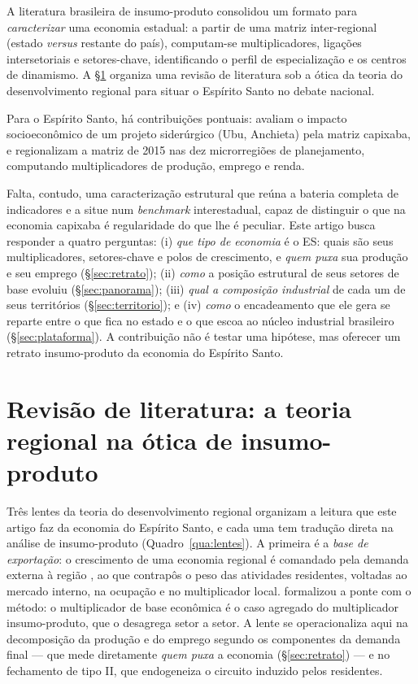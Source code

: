 \documentclass[11pt,a4paper]{article}
\begin{document}
A literatura brasileira de insumo-produto consolidou um formato para \emph{caracterizar}
uma economia estadual: a partir de uma matriz inter-regional (estado \emph{versus}
restante do país), computam-se multiplicadores, ligações intersetoriais e
setores-chave, identificando o perfil de especialização e os centros de dinamismo.
A \S\ref{sec:quadro} organiza uma revisão de literatura sob a ótica da teoria do
desenvolvimento regional para situar o Espírito Santo no debate nacional.

Para o Espírito Santo, há contribuições pontuais: \citet{sessa2017ubu} avaliam o impacto
socioeconômico de um projeto siderúrgico (Ubu, Anchieta) pela matriz capixaba, e
\citet{ribeiro2024dinamica} regionalizam a matriz de 2015 nas dez microrregiões de
planejamento, computando multiplicadores de produção, emprego e renda.

Falta, contudo, uma caracterização estrutural que reúna a bateria completa de indicadores e a
situe num \emph{benchmark} interestadual, capaz de distinguir o que na economia capixaba é
regularidade do que lhe é peculiar.
Este artigo busca responder a quatro perguntas: (i) \emph{que tipo de economia} é o ES:
quais são seus multiplicadores, setores-chave e polos de crescimento, e \emph{quem puxa}
sua produção e seu emprego (\S\ref{sec:retrato});
(ii) \emph{como} a posição estrutural de seus setores de base evoluiu
(\S\ref{sec:panorama}); (iii) \emph{qual a composição industrial} de cada um de seus
territórios (\S\ref{sec:territorio}); e (iv) \emph{como} o encadeamento que ele gera se
reparte entre o que fica no estado e o que escoa ao núcleo industrial brasileiro
(\S\ref{sec:plataforma}). A contribuição não é testar uma hipótese, mas oferecer um retrato
insumo-produto da economia do Espírito Santo.

\section{Revisão de literatura: a teoria regional na ótica de insumo-produto}
\label{sec:quadro}
Três lentes da teoria do desenvolvimento regional organizam a leitura que este artigo faz da
economia do Espírito Santo, e cada uma tem tradução direta na análise de insumo-produto
(Quadro~\ref{qua:lentes}). A primeira é a \emph{base de exportação}: o crescimento de uma
economia regional é comandado pela demanda externa à região \citep{north1955}, ao que
\citet{tiebout1956} contrapôs o peso das atividades residentes, voltadas ao mercado interno,
na ocupação e no multiplicador local. \citet{richardson1985} formalizou a ponte com o método:
o multiplicador de base econômica é o caso agregado do multiplicador insumo-produto, que o
desagrega setor a setor. A lente se operacionaliza aqui na decomposição da produção e do
emprego segundo os componentes da demanda final --- que mede diretamente \emph{quem puxa} a
economia (\S\ref{sec:retrato}) --- e no fechamento de tipo II, que endogeneiza o circuito
induzido pelos residentes.
\end{document}
